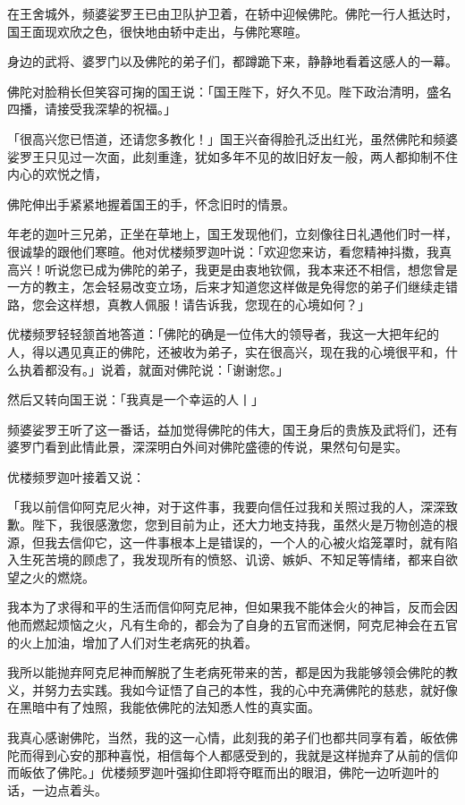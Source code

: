 \documentclass[12pt,twoside,openany]{book}
\begin{document}
在王舍城外，频婆娑罗王已由卫队护卫着，在轿中迎候佛陀。佛陀一行人抵达时，国王面现欢欣之色，很快地由轿中走出，与佛陀寒暄。

身边的武将、婆罗门以及佛陀的弟子们，都蹲跪下来，静静地看着这感人的一幕。

佛陀对脸稍长但笑容可掬的国王说：「国王陛下，好久不见。陛下政治清明，盛名四播，请接受我深挚的祝福。」

「很高兴您已悟道，还请您多教化！」国王兴奋得脸孔泛出红光，虽然佛陀和频婆娑罗王只见过一次面，此刻重逢，犹如多年不见的故旧好友一般，两人都抑制不住内心的欢悦之情，

佛陀伸出手紧紧地握着国王的手，怀念旧时的情景。

年老的迦叶三兄弟，正坐在草地上，国王发现他们，立刻像往日礼遇他们时一样，很诚挚的跟他们寒暄。他对优楼频罗迦叶说：「欢迎您来访，看您精神抖擞，我真高兴！听说您已成为佛陀的弟子，我更是由衷地钦佩，我本来还不相信，想您曾是一方的教主，怎会轻易改变立场，后来才知道您这样做是免得您的弟子们继续走错路，您会这样想，真教人佩服！请告诉我，您现在的心境如何？」

优楼频罗轻轻颔首地答道：「佛陀的确是一位伟大的领导者，我这一大把年纪的人，得以遇见真正的佛陀，还被收为弟子，实在很高兴，现在我的心境很平和，什么执着都没有。」说着，就面对佛陀说：「谢谢您。」

然后又转向国王说：「我真是一个幸运的人丨」

频婆娑罗王听了这一番话，益加觉得佛陀的伟大，国王身后的贵族及武将们，还有婆罗门看到此情此景，深深明白外间对佛陀盛德的传说，果然句句是实。

优楼频罗迦叶接着又说：

「我以前信仰阿克尼火神，对于这件事，我要向信任过我和关照过我的人，深深致歉。陛下，我很感激您，您到目前为止，还大力地支持我，虽然火是万物创造的根源，但我去信仰它，这一件事根本上是错误的，一个人的心被火焰笼罩时，就有陷入生死苦境的顾虑了，我发现所有的愤怒、讥谤、嫉妒、不知足等情绪，都来自欲望之火的燃烧。

我本为了求得和平的生活而信仰阿克尼神，但如果我不能体会火的神旨，反而会因他而燃起烦恼之火，凡有生命的，都会为了自身的五官而迷惘，阿克尼神会在五官的火上加油，增加了人们对生老病死的执着。

我所以能抛弃阿克尼神而解脱了生老病死带来的苦，都是因为我能够领会佛陀的教义，并努力去实践。我如今证悟了自己的本性，我的心中充满佛陀的慈悲，就好像在黑暗中有了烛照，我能依佛陀的法知悉人性的真实面。

我真心感谢佛陀，当然，我的这一心情，此刻我的弟子们也都共同享有着，皈依佛陀而得到心安的那种喜悦，相信每个人都感受到的，我就是这样抛弃了从前的信仰而皈依了佛陀。」优楼频罗迦叶强抑住即将夺眶而出的眼泪，佛陀一边听迦叶的话，一边点着头。
\end{document}
